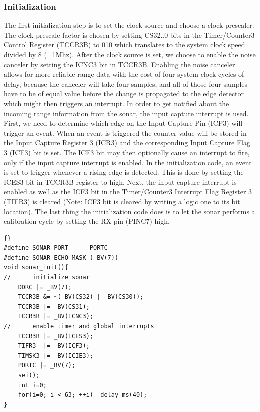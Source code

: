 \subsubsection{Initialization}
The first initialization step is to set the clock source and choose a clock prescaler. The clock prescale factor is chosen by setting CS32..0 bits in the Timer/Counter3 Control Register (TCCR3B) to 010 which translates to the system clock speed divided by 8 (=1Mhz). After the clock source is set, we choose to enable the noise canceler by setting the ICNC3 bit in TCCR3B. Enabling the noise canceler allows for more reliable range data with the cost of four system clock cycles of delay, because the canceler will take four samples, and all of those four samples have to be of equal value before the change is propagated to the edge detector which might then triggers an interrupt. In order to get notified about the incoming range information from the sonar, the input capture interrupt is used. First, we need to determine which edge on the Input Capture Pin (ICP3) will trigger an event. When an event is triggered the counter value will be stored in the Input Capture Register 3 (ICR3) and the corresponding Input Capture Flag 3 (ICF3) bit is set. The ICF3 bit may then optionally cause an interrupt to fire, only if the input capture interrupt is enabled. In the initialization code, an event is set to trigger whenever a rising edge is detected. This is done by setting the ICES3 bit in TCCR3B register to high. Next, the input capture interrupt is enabled as well as the ICF3 bit in the Timer/Counter3 Interrupt Flag Register 3 (TIFR3) is cleared (Note: ICF3 bit is cleared by writing a logic one to its bit location). The last thing the initialization code does is to let the sonar performs a calibration cycle by setting the RX pin (PINC7) high.

\lstset{language=c}
\lstset{commentstyle=\textit}
\begin{lstlisting}[frame=trbl]{}
#define SONAR_PORT      PORTC
#define SONAR_ECHO_MASK (_BV(7))                                        
void sonar_init(){
//      initialize sonar
	DDRC |= _BV(7);                       
    TCCR3B &= ~(_BV(CS32) | _BV(CS30));     
    TCCR3B |= _BV(CS31);                            
    TCCR3B |= _BV(ICNC3);                           
//      enable timer and global interrupts
    TCCR3B |= _BV(ICES3);
    TIFR3  |= _BV(ICF3);
    TIMSK3 |= _BV(ICIE3);
    PORTC |= _BV(7);
    sei();
	int i=0;
    for(i=0; i < 63; ++i) _delay_ms(40);
}
\end{lstlisting}


